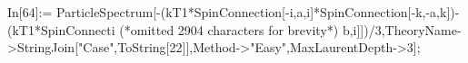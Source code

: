 In[64]:= ParticleSpectrum[-(kT1*SpinConnection[-i,a,i]*SpinConnection[-k,-a,k])-(kT1*SpinConnecti (*omitted 2904 characters for brevity*) b,i]])/3,TheoryName->StringJoin["Case",ToString[22]],Method->"Easy",MaxLaurentDepth->3];